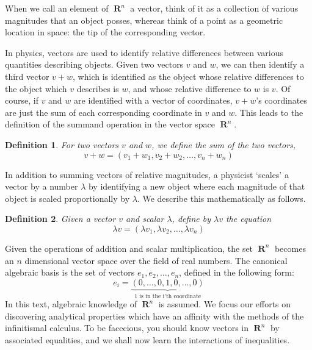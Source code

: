 \documentclass{report}
\newtheorem{definition}{Definition}
\DeclareMathOperator{\real}{\mathbf{R}}
\begin{document}
When we call an element of $\real^n$ a vector, think of it as a collection of various magnitudes that an object posses, whereas think of a point as a geometric location in space: the tip of the corresponding vector.

In physics, vectors are used to identify relative differences between various quantities describing objects. Given two vectors $v$ and $w$, we can then identify a third vector $v + w$, which is identified as the object whose relative differences to the object which $v$ describes is $w$, and whose relative difference to $w$ is $v$. Of course, if $v$ and $w$ are identified with a vector of coordinates, $v + w$'s coordinates are just the sum of each corresponding coordinate in $v$ and $w$. This leads to the definition of the summand operation in the vector space $\real^n$.

\begin{definition}
  For two vectors $v$ and $w$, we define the sum of the two vectors,
  \[v + w = (v_1 + w_1, v_2 + w_2, \dots, v_n + w_n)\]
\end{definition}

\begin{center}
\end{center}

In addition to summing vectors of relative magnitudes, a physicist `scales' a vector by a number $\lambda$ by identifying a new object where each magnitude of that object is scaled proportionally by $\lambda$. We describe this mathematically as follows.

\begin{definition}
  Given a vector $v$ and scalar $\lambda$, define by $\lambda v$ the equation
  \[ \lambda v = (\lambda v_1, \lambda v_2, \dots, \lambda v_n) \]
\end{definition}

Given the operations of addition and scalar multiplication, the set $\real^n$ becomes an $n$ dimensional vector space over the field of real numbers. The canonical algebraic basis is the set of vectors $e_1, e_2, \dots, e_n$, defined in the following form:
%
\[ e_i = \underbrace{(0, \dots, 0, 1, 0, \dots, 0)}_\text{1 is in the i'th coordinate} \]
%
In this text, algebraic knowledge of $\real^n$ is assumed. We focus our efforts on discovering analytical properties which have an affinity with the methods of the infinitismal calculus. To be facecious, you should know vectors in $\real^n$ by associated equalities, and we shall now learn the interactions of inequalities.
\end{document}
